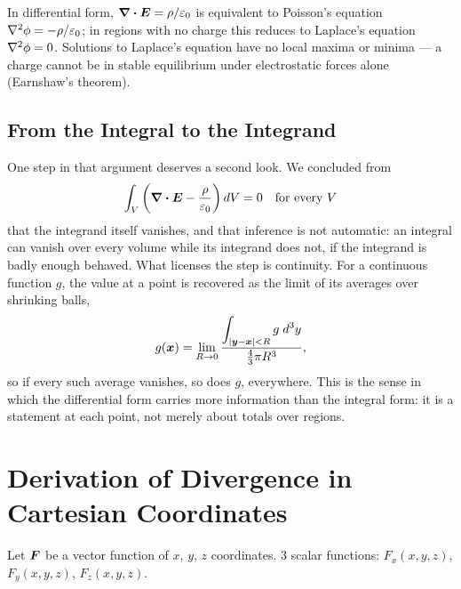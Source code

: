 In differential form, $\div\vect{E} = \rho/\varepsilon_0$ is equivalent to Poisson's equation $\laplacian\phi = -\rho/\varepsilon_0$; in regions with no charge this reduces to Laplace's equation $\laplacian\phi = 0$. Solutions to Laplace's equation have no local maxima or minima --- a charge cannot be in stable equilibrium under electrostatic forces alone (Earnshaw's theorem).


\subsection{From the Integral to the Integrand}

One step in that argument deserves a second look. We concluded from
\[
    \int_V \left(\div\vect{E} - \frac{\rho}{\varepsilon_0}\right) dV = 0 \quad\text{for every } V
\]
that the integrand itself vanishes, and that inference is not automatic: an integral can vanish over every volume while its integrand does not, if the integrand is badly enough behaved. What licenses the step is continuity. For a continuous function $g$, the value at a point is recovered as the limit of its averages over shrinking balls,
\[
    g(\bm{x}) = \lim_{R\to 0}\frac{\displaystyle\int_{|\bm{y}-\bm{x}|<R} g\; d^3y}{\tfrac{4}{3}\pi R^3},
\]
so if every such average vanishes, so does $g$, everywhere. This is the sense in which the differential form carries more information than the integral form: it is a statement at each point, not merely about totals over regions.

\section{Derivation of Divergence in Cartesian Coordinates}

Let $\vect{F}$ be a vector function of $x$, $y$, $z$ coordinates. 3 scalar functions: $F_x(x,y,z)$, $F_y(x,y,z)$, $F_z(x,y,z)$.

